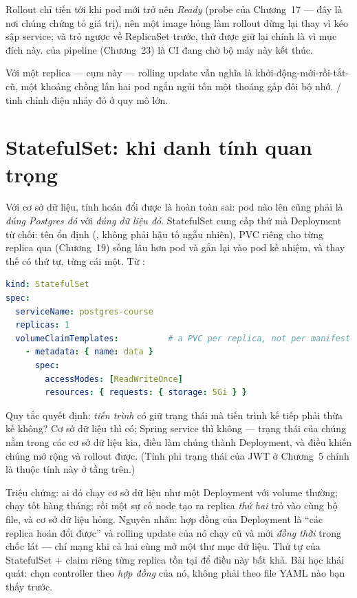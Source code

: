 Rollout chỉ tiến tới khi pod mới trở nên \emph{Ready} (probe của
Chương~17 --- đây là nơi chúng chứng tỏ giá trị), nên một image hỏng
làm rollout dừng lại thay vì kéo sập service; và
 trỏ ngược về ReplicaSet trước, thứ được giữ
lại chính là vì mục đích này.  của
pipeline (Chương~23) là CI đang chờ bộ máy này kết thúc.

Với một replica --- cụm này --- rolling update vẫn nghĩa là
khởi-động-mới-rồi-tắt-cũ, một khoảng chồng lấn hai pod ngắn ngủi tốn
một thoáng gấp đôi bộ nhớ. / tinh
chỉnh điệu nhảy đó ở quy mô lớn.

\section{StatefulSet: khi danh tính quan trọng}

Với cơ sở dữ liệu, tính hoán đổi được là hoàn toàn sai: pod nào lên
cũng phải là \emph{đúng Postgres đó} với \emph{đúng dữ liệu đó}.
StatefulSet cung cấp thứ mà Deployment từ chối: tên ổn định
(, không phải hậu tố ngẫu nhiên), PVC riêng cho
từng replica qua  (Chương~19) sống lâu hơn
pod và gắn lại vào pod kế nhiệm, và thay thế có thứ tự, từng cái một.
Từ :

\begin{lstlisting}[language=yaml]
kind: StatefulSet
spec:
  serviceName: postgres-course
  replicas: 1
  volumeClaimTemplates:          # a PVC per replica, not per manifest
    - metadata: { name: data }
      spec:
        accessModes: [ReadWriteOnce]
        resources: { requests: { storage: 5Gi } }
\end{lstlisting}

Quy tắc quyết định: \emph{tiến trình} có giữ trạng thái mà tiến trình
kế tiếp phải thừa kế không? Cơ sở dữ liệu thì có; Spring service thì
không --- trạng thái của chúng nằm trong các cơ sở dữ liệu kia, điều
làm chúng thành Deployment, và điều khiến chúng mở rộng và rollout được.
(Tính phi trạng thái của JWT ở Chương~5 chính là thuộc tính này ở tầng
trên.)

\begin{pitfall}
Triệu chứng: ai đó chạy cơ sở dữ liệu như một Deployment với volume
thường; chạy tốt hàng tháng; rồi một sự cố node tạo ra replica
\emph{thứ hai} trỏ vào cùng bộ file, và cơ sở dữ liệu hỏng. Nguyên
nhân: hợp đồng của Deployment là ``các replica hoán đổi được'' và
rolling update của nó chạy cũ và mới \emph{đồng thời} trong chốc lát
--- chí mạng khi cả hai cùng mở một thư mục dữ liệu. Thứ tự của
StatefulSet + claim riêng từng replica tồn tại để điều này bất khả. Bài
học khái quát: chọn controller theo \emph{hợp đồng} của nó, không phải
theo file YAML nào bạn thấy trước.
\end{pitfall}

